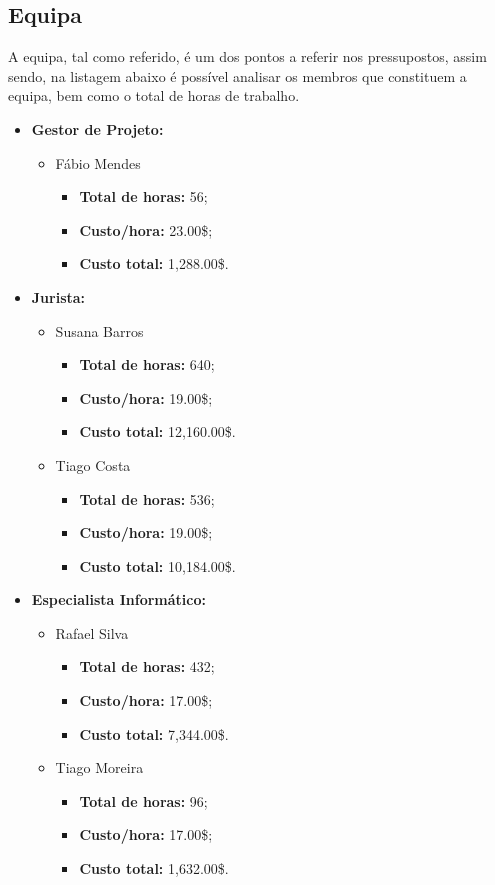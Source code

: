 
\subsection{Equipa}

A equipa, tal como referido, é um dos pontos a referir nos pressupostos, assim sendo, na listagem abaixo é possível analisar os membros que constituem a equipa, bem como o total de horas de trabalho.

\begin{itemize}
	\item \textbf{Gestor de Projeto:}
		\begin{itemize}
			\item Fábio Mendes
				\begin{itemize}
					\item \textbf{Total de horas:} 56;
					\item \textbf{Custo/hora:} 23.00\$;
					\item \textbf{Custo total:} 1,288.00\$.
				\end{itemize}
		\end{itemize}

	\item \textbf{Jurista:}
		\begin{itemize}
			\item Susana Barros
				\begin{itemize}
					\item \textbf{Total de horas:} 640;
					\item \textbf{Custo/hora:} 19.00\$;
					\item \textbf{Custo total:} 12,160.00\$.
				\end{itemize}
			\item Tiago Costa
				\begin{itemize}
					\item \textbf{Total de horas:} 536;
					\item \textbf{Custo/hora:} 19.00\$;
					\item \textbf{Custo total:} 10,184.00\$.
				\end{itemize}
		\end{itemize}

	\item \textbf{Especialista Informático:}
		\begin{itemize}
			\item Rafael Silva
				\begin{itemize}
					\item \textbf{Total de horas:} 432;
					\item \textbf{Custo/hora:} 17.00\$;
					\item \textbf{Custo total:} 7,344.00\$.
				\end{itemize}
			\item Tiago Moreira
				\begin{itemize}
					\item \textbf{Total de horas:} 96;
					\item \textbf{Custo/hora:} 17.00\$;
					\item \textbf{Custo total:} 1,632.00\$.
				\end{itemize}
		\end{itemize}


\end{itemize}
